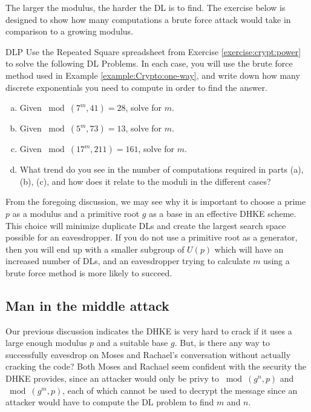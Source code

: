 The larger the modulus, the harder the DL is to find. The exercise below is designed to show how many computations a brute force attack would take in comparison to a growing modulus.

\begin{exercise}{DLP}
Use the Repeated Square spreadsheet from Exercise \ref{exercise:crypt:power} to solve the following DL Problems. In each case, you will use the brute force method used in Example \ref{example:Crypto:one-way}, and write down how many discrete exponentials you need to compute in order to find the answer.  
\begin{enumerate}[(a)]
\item Given $ \bmod(7^{m}, 41)=28$, solve for $m$.

\item Given $ \bmod(5^{m}, 73)=13$, solve for $m$.

\item Given $ \bmod(17^{m}, 211)=161$, solve for $m$.

\item
What trend do you see in the number of computations required in parts (a), (b), (c), and how does it relate to the moduli in the different cases?
\end{enumerate}
\end{exercise}

From the foregoing discussion, we may see why it is important to choose a prime $p$ as a modulus and a primitive root $g$ as a base in an effective DHKE scheme. This choice will minimize duplicate DLs and create the largest search space possible for an eavesdropper.  If you do not use a primitive root as a generator, then you will end up with a smaller subgroup of $U(p)$ which will have an increased number of DLs, and an eavesdropper trying to calculate $m$ using a brute force method is more likely to succeed. 

\subsection{Man in the middle attack}
Our previous discussion indicates the DHKE is very hard to crack if it uses a large enough modulus $p$ and a suitable base $g$. But, is there any way to successfully eavesdrop on Moses and Rachael's conversation without actually cracking the code?  Both Moses and Rachael seem confident with the security the DHKE provides, since an attacker would only be privy to $\bmod (g^n , p)$ and $\bmod (g^m , p)$, each of which cannot be used to decrypt the message since an attacker would have to compute the DL problem to find $m$ and $n$. 

